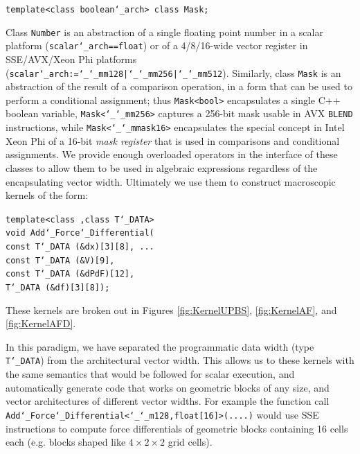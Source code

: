 \begin{shaded}
\texttt{template<class boolean\char`_arch> class Mask;}
\end{shaded}
\vspace*{-.1in} Class \texttt{Number} is an abstraction of a single
floating point number in a scalar platform
(\texttt{scalar\char`_arch==float}) or of a 4/8/16-wide vector
register in SSE/AVX/Xeon Phi platforms
(\texttt{scalar\char`_arch:=\char`_\char`_mm128|\char`_\char`_mm256|\char`_\char`_mm512}). Similarly,
class \texttt{Mask} is an abstraction of the result of a comparison
operation, in a form that can be used to perform a conditional
assignment; thus \texttt{Mask<bool>} encapsulates a single C++ boolean
variable, \texttt{Mask<\char`_\char`_mm256>} captures a 256-bit mask
usable in AVX \texttt{BLEND} instructions, while
\texttt{Mask<\char`_\char`_mmask16>} encapsulates the special concept
in Intel Xeon Phi of a 16-bit \emph{mask register} that is used in
comparisons and conditional assignments. We provide enough overloaded
operators in the interface of these classes to allow them to be used
in algebraic expressions regardless of the encapsulating vector
width. Ultimately we use them to construct macroscopic kernels of the
form:
\begin{shaded}
\texttt{template<class ,class T\char`_DATA>}\\
\texttt{void Add\char`_Force\char`_Differential(}\\
\texttt{\hspace*{2em}const T\char`_DATA (\&dx)[3][8], ...}\\
\texttt{\hspace*{2em}const T\char`_DATA (\&V)[9],}\\
\texttt{\hspace*{2em}const T\char`_DATA (\&dPdF)[12],}\\
\texttt{\hspace*{2em}T\char`_DATA (\&df)[3][8]);}
\end{shaded}
These kernels are broken out in Figures \ref{fig:KernelUPBS},
\ref{fig:KernelAF}, and \ref{fig:KernelAFD}.

In this paradigm, we have separated the programmatic
data width (type
\texttt{T\char`_DATA}) from the architectural vector width. This allows us
to these kernels with the same
semantics that would be followed for scalar execution, and
automatically generate code that works on geometric blocks of any
size, and vector architectures of different vector widths. For example
the function call
\texttt{Add\char`_Force\char`_Differential<\char`_\char`_m128,float[16]>(....)}
would use SSE instructions to compute force differentials of geometric
blocks containing 16 cells each (e.g. blocks shaped like
$4\times 2\times 2$ grid cells). 


